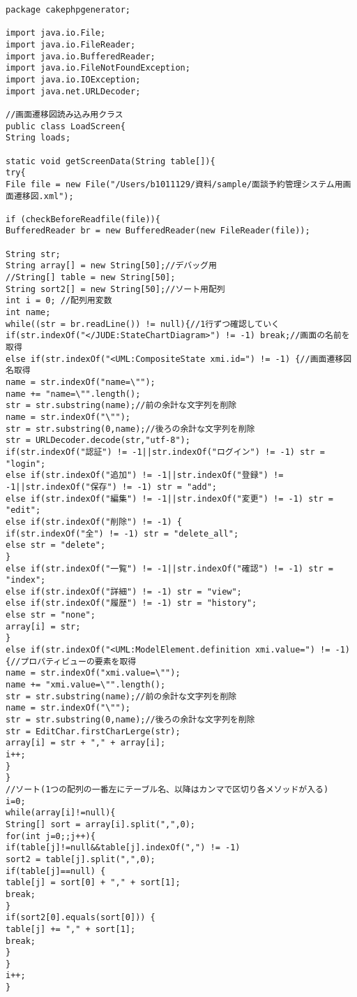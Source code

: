 \documentclass{funthesis}
\begin{document}
\begin{lstlisting}[caption=LoadScreen.java,label=1]
package cakephpgenerator;

import java.io.File;
import java.io.FileReader;
import java.io.BufferedReader;
import java.io.FileNotFoundException;
import java.io.IOException;
import java.net.URLDecoder;

//画面遷移図読み込み用クラス
public class LoadScreen{
String loads;

static void getScreenData(String table[]){
try{
File file = new File("/Users/b1011129/資料/sample/面談予約管理システム用画面遷移図.xml");

if (checkBeforeReadfile(file)){
BufferedReader br = new BufferedReader(new FileReader(file));

String str;
String array[] = new String[50];//デバッグ用
//String[] table = new String[50];
String sort2[] = new String[50];//ソート用配列
int i = 0; //配列用変数
int name;
while((str = br.readLine()) != null){//1行ずつ確認していく
if(str.indexOf("</JUDE:StateChartDiagram>") != -1) break;//画面の名前を取得
else if(str.indexOf("<UML:CompositeState xmi.id=") != -1) {//画面遷移図名取得
name = str.indexOf("name=\"");
name += "name=\"".length();
str = str.substring(name);//前の余計な文字列を削除
name = str.indexOf("\"");
str = str.substring(0,name);//後ろの余計な文字列を削除
str = URLDecoder.decode(str,"utf-8");
if(str.indexOf("認証") != -1||str.indexOf("ログイン") != -1) str = "login";
else if(str.indexOf("追加") != -1||str.indexOf("登録") != -1||str.indexOf("保存") != -1) str = "add";
else if(str.indexOf("編集") != -1||str.indexOf("変更") != -1) str = "edit";
else if(str.indexOf("削除") != -1) {
if(str.indexOf("全") != -1) str = "delete_all";
else str = "delete";
}
else if(str.indexOf("一覧") != -1||str.indexOf("確認") != -1) str = "index";
else if(str.indexOf("詳細") != -1) str = "view";
else if(str.indexOf("履歴") != -1) str = "history";
else str = "none";
array[i] = str;
}
else if(str.indexOf("<UML:ModelElement.definition xmi.value=") != -1) {//プロパティビューの要素を取得
name = str.indexOf("xmi.value=\"");
name += "xmi.value=\"".length();
str = str.substring(name);//前の余計な文字列を削除
name = str.indexOf("\"");
str = str.substring(0,name);//後ろの余計な文字列を削除
str = EditChar.firstCharLerge(str);
array[i] = str + "," + array[i];
i++;
}
}
//ソート(1つの配列の一番左にテーブル名、以降はカンマで区切り各メソッドが入る)
i=0;
while(array[i]!=null){
String[] sort = array[i].split(",",0);
for(int j=0;;j++){
if(table[j]!=null&&table[j].indexOf(",") != -1)
sort2 = table[j].split(",",0);
if(table[j]==null) {
table[j] = sort[0] + "," + sort[1];
break;
}
if(sort2[0].equals(sort[0])) {
table[j] += "," + sort[1];
break;
}
}
i++;
}


\end{lstlisting}
\end{document}
